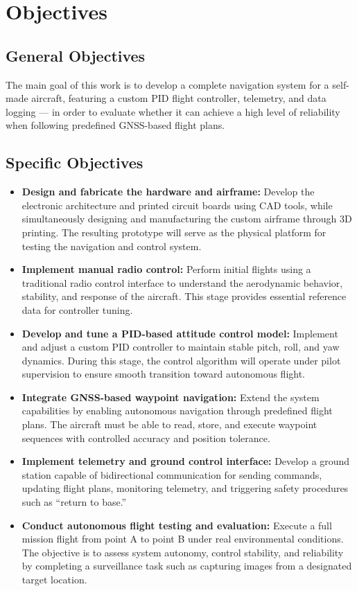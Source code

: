 \section{Objectives}
\subsection{General Objectives}

The main goal of this work is to develop a complete navigation system for a self-made aircraft, featuring a custom PID flight controller, telemetry, and data logging — in order to evaluate whether it can achieve a high level of reliability when following predefined GNSS-based flight plans.

\subsection{Specific Objectives}

\begin{itemize}
    \item \textbf{Design and fabricate the hardware and airframe:} Develop the electronic architecture and printed circuit boards using CAD tools, while simultaneously designing and manufacturing the custom airframe through 3D printing. The resulting prototype will serve as the physical platform for testing the navigation and control system.
    
    \item \textbf{Implement manual radio control:} Perform initial flights using a traditional radio control interface to understand the aerodynamic behavior, stability, and response of the aircraft. This stage provides essential reference data for controller tuning.
    
    \item \textbf{Develop and tune a PID-based attitude control model:} Implement and adjust a custom PID controller to maintain stable pitch, roll, and yaw dynamics. During this stage, the control algorithm will operate under pilot supervision to ensure smooth transition toward autonomous flight.
    
    \item \textbf{Integrate GNSS-based waypoint navigation:} Extend the system capabilities by enabling autonomous navigation through predefined flight plans. The aircraft must be able to read, store, and execute waypoint sequences with controlled accuracy and position tolerance.
    
    \item \textbf{Implement telemetry and ground control interface:} Develop a ground station capable of bidirectional communication for sending commands, updating flight plans, monitoring telemetry, and triggering safety procedures such as “return to base.” 
    
    \item \textbf{Conduct autonomous flight testing and evaluation:} Execute a full mission flight from point A to point B under real environmental conditions. The objective is to assess system autonomy, control stability, and reliability by completing a surveillance task such as capturing images from a designated target location.
\end{itemize}

